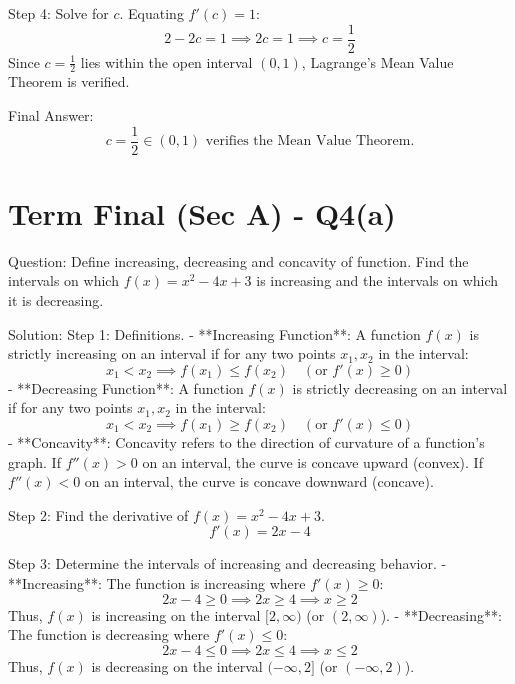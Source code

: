 \documentclass{article}
\begin{document}
Step 4: Solve for $c$.
Equating $f'(c) = 1$:
\[
2 - 2c = 1 \implies 2c = 1 \implies c = \frac{1}{2}
\]
Since $c = \frac{1}{2}$ lies within the open interval $(0, 1)$, Lagrange's Mean Value Theorem is verified.

Final Answer:
\[
\boxed{c = \frac{1}{2} \in (0, 1) \text{ verifies the Mean Value Theorem.}}
\]

\section*{Term Final (Sec A) - Q4(a)}
Question:
Define increasing, decreasing and concavity of function. Find the intervals on which $f(x) = x^2 - 4x + 3$ is increasing and the intervals on which it is decreasing.

Solution:
Step 1: Definitions.
- **Increasing Function**: A function $f(x)$ is strictly increasing on an interval if for any two points $x_1, x_2$ in the interval:
  \[
  x_1 < x_2 \implies f(x_1) \le f(x_2) \quad (\text{or } f'(x) \ge 0)
  \]
- **Decreasing Function**: A function $f(x)$ is strictly decreasing on an interval if for any two points $x_1, x_2$ in the interval:
  \[
  x_1 < x_2 \implies f(x_1) \ge f(x_2) \quad (\text{or } f'(x) \le 0)
  \]
- **Concavity**: Concavity refers to the direction of curvature of a function's graph. If $f''(x) > 0$ on an interval, the curve is concave upward (convex). If $f''(x) < 0$ on an interval, the curve is concave downward (concave).

Step 2: Find the derivative of $f(x) = x^2 - 4x + 3$.
\[
f'(x) = 2x - 4
\]

Step 3: Determine the intervals of increasing and decreasing behavior.
- **Increasing**: The function is increasing where $f'(x) \ge 0$:
  \[
  2x - 4 \ge 0 \implies 2x \ge 4 \implies x \ge 2
  \]
  Thus, $f(x)$ is increasing on the interval $[2, \infty)$ (or $(2, \infty)$).
- **Decreasing**: The function is decreasing where $f'(x) \le 0$:
  \[
  2x - 4 \le 0 \implies 2x \le 4 \implies x \le 2
  \]
  Thus, $f(x)$ is decreasing on the interval $(-\infty, 2]$ (or $(-\infty, 2)$).
\end{document}
